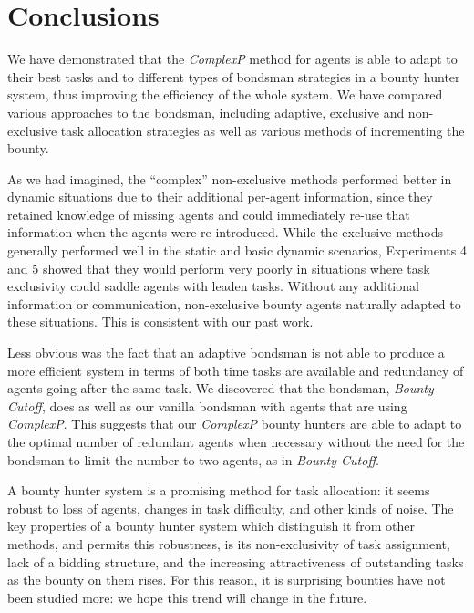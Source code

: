 \documentclass[letterpaper]{aamas2015}
\begin{document}
\vspace{-0.5em}
\section{Conclusions} 

We have demonstrated that the \textit{ComplexP} method for agents is able to adapt to their best tasks and to different types of bondsman strategies in a bounty hunter system, thus improving the efficiency of the whole system.  We have compared various approaches to the bondsman, including adaptive, exclusive and non-exclusive task allocation strategies as well as various methods of incrementing the bounty.

As we had imagined, the ``complex'' non-exclusive methods performed better in dynamic situations due to their additional per-agent information, since they retained knowledge of missing agents and could immediately re-use that information when the agents were re-introduced.    While the exclusive methods generally performed well in the static and basic dynamic scenarios, Experiments 4 and 5 showed that they would perform very poorly in situations where task exclusivity could saddle agents with leaden tasks.  Without any additional information or communication, non-exclusive bounty agents naturally adapted to these situations.  This is consistent with our past work.

Less obvious was the fact that an adaptive bondsman is not able to produce a more efficient system in terms of both time tasks are available and redundancy of agents going after the same task.  We discovered that the bondsman, \textit{Bounty Cutoff}, does as well as our vanilla bondsman with agents that are using \textit{ComplexP}.  This suggests that our \textit{ComplexP} bounty hunters are able to adapt to the optimal number of redundant agents when necessary without the need for the bondsman to limit the number to two agents, as in \textit{Bounty Cutoff}.

A bounty hunter system is a promising method for task allocation: it seems robust to loss of agents, changes in task difficulty, and other kinds of noise.  The key properties of a bounty hunter system which distinguish it from other methods, and permits this robustness, is its non-exclusivity of task assignment, lack of a bidding structure, and the increasing attractiveness of outstanding tasks as the bounty on them rises.  For this reason, it is surprising bounties have not been studied more: we hope this trend will change in the future.


\vspace{-0.5em}


\end{document}
